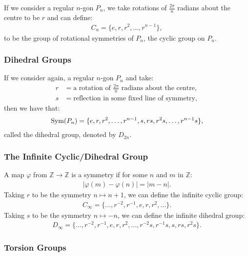 If we consider a regular $n$-gon $P_n$, we take rotations of
$\frac{2\pi}{n}$ radians about the centre to be $r$ and can define: \begin{align*}
    C_n = \{e, r, r^2, \ldots, r^{n - 1}\},
\end{align*} to be the group of rotational symmetries of $P_n$, the cyclic
group on $P_n$.

\subsubsection{Dihedral Groups}

If we consider again, a regular $n$-gon $P_n$ and take: \begin{align*}
    r &= \text{a rotation of } \frac{2\pi}{n} \text{ radians about the centre}, \\
    s &= \text{reflection in some fixed line of symmetry},
\end{align*} then we have that: \begin{align*}
    \operatorname{Sym}(P_n) = \{e, r, r^2, \ldots, r^{n - 1}, s, rs, r^2s, \ldots, r^{n - 1}s\},
\end{align*} called the dihedral group, denoted by $D_{2n}$.

\subsubsection{The Infinite Cyclic/Dihedral Group}

A map $\varphi$ from $\mathbb{Z} \to \mathbb{Z}$ is a symmetry if for some
$n$ and $m$ in $\mathbb{Z}$: \begin{align*}
    |\varphi(m) - \varphi(n)| = |m - n|.
\end{align*} Taking $r$ to be the symmetry $n \mapsto n + 1$, we can define the
infinite cyclic group: \begin{align*}
    C_\infty = \{\ldots, r^{-2}, r^{-1}, e, r, r^2, \ldots\}.
\end{align*} Taking $s$ to be the symmetry $n \mapsto -n$, we can define the
infinite dihedral group: \begin{align*}
    D_\infty = \{\ldots, r^{-2}, r^{-1}, e, r, r^2, \ldots, r^{-2}s, r^{-1}s, s, rs, r^2s\}.
\end{align*}

\subsubsection{Torsion Groups}

